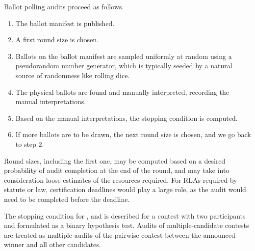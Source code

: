 Ballot polling audits proceed as follows. 
\begin{enumerate}
\item The ballot manifest is published. 
\item A first round size \cite{usenix_minerva} is chosen. %
\item Ballots on the ballot manifest are sampled uniformly at random using a pseudorandom number generator, which is typically seeded by a natural source of randomness like rolling dice.
\item The physical ballots are found and manually interpreted, recording the manual interpretations. 
\item Based on the manual interpretations, the stopping condition is computed. 
\item If more ballots are to be drawn, the next round size is chosen, and we go back to step 2. 
\end{enumerate} 

Round sizes, including the first one, may be computed based on a desired probability of audit completion at the end of the round, and may take into consideration loose estimates of the resources required. For RLAs required by statute or law, certification deadlines would play a large role, as the audit would need to be completed before the deadline. 

The stopping condition for \BRAVO, \Minerva and \Providence is described for a contest with two participants and formulated as a binary hypothesis test. Audits of multiple-candidate contests are treated as multiple audits of the pairwise contest between the announced winner and all other candidates.



